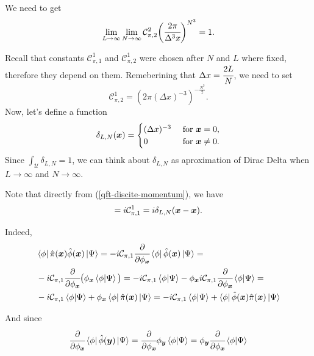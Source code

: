 \documentclass[main.tex]{subfiles}
\begin{document}
We need to get
\begin{equation}
\lim_{L\to \infty}\lim_{N\to \infty} \mathcal{C}^2_{\pi,2}\bigg(\cfrac{2\pi}{\Delta^3 x} \bigg)^{N^3}  = 1.
\end{equation}

Recall that constants $\mathcal{C}^1_{\pi,1}$ and $\mathcal{C}^1_{\pi,2}$ were chosen after $N$ and $L$ where fixed, therefore they depend on them. 
Remeberining that $\Delta x = \cfrac{2L}{N}$, we need to set
\begin{equation}
\mathcal{C}^1_{\pi,2} = (2\pi (\Delta x)^{-3})^{- \frac{N^3}{2}}.
\end{equation}
Now, let's define a function
\begin{equation}
\delta_{L,N}(\boldsymbol{x}) = 
\begin{cases}
(\Delta x)^{-3} &\text{ for } \boldsymbol{x} = 0,\\
0 &\text{ for } \boldsymbol{x} \not=0.
\end{cases}
\end{equation}
Since $\int_\mathcal{U} \delta_{L,N} = 1$, we can think about $\delta_{L,N}$ as aproximation of Dirac Delta when $L\to\infty$ and $N\to\infty$.

Note that directly from (\ref{qft-discite-momentum}), we have
\begin{equation}
[\hat{\phi}(\bs{x}), \hat{\pi}(\bs{x})] = i \mathcal{C}^1_{\pi,1} = i \delta_{L,N}(\bs{x} - \bs{x}).
\end{equation}

Indeed,
\begin{align*}
& \bra{\phi} \hat{\pi}(\boldsymbol{x}) \hat{\phi}(\boldsymbol{x})\ket{\Psi} = -i\mathcal{C}_{\pi, 1}
\cfrac{\partial}{\partial \phi_{\boldsymbol{x}}}
\bra{\phi} \hat{\phi}(\boldsymbol{x})\ket{\Psi} = \\
& -i\mathcal{C}_{\pi, 1} \cfrac{\partial}{\partial \phi_{\boldsymbol{x}}}
\big( \phi_{\boldsymbol{x}} \bra{\phi}\ket{\Psi}\big) = -i \mathcal{C}_{\pi, 1} \bra{\phi}\ket{\Psi} - \phi_{\boldsymbol{x}}i\mathcal{C}_{\pi, 1}
\cfrac{\partial}{\partial \phi_{\boldsymbol{x}}}\bra{\phi}\ket{\Psi} = \\
& -i \mathcal{C}_{\pi, 1} \bra{\phi}\ket{\Psi} + \phi_{\boldsymbol{x}} \bra{\phi} \hat{\pi}(\boldsymbol{x}) \ket{\Psi} =
-i \mathcal{C}_{\pi, 1} \bra{\phi}\ket{\Psi} + \bra{\phi}\hat{\phi}(\boldsymbol{x})\hat{\pi}(\boldsymbol{x}) \ket{\Psi}
\end{align*}

And since 
\begin{align*}
\cfrac{\partial}{\partial \phi_{\boldsymbol{x}}}  \bra{\phi} \hat{\phi}(\boldsymbol{y}) \ket{\Psi} = 
\cfrac{\partial}{\partial \phi_{\boldsymbol{x}}} \phi_{\boldsymbol{y}}  \bra{\phi} \ket{\Psi} =
\phi_{\boldsymbol{y}} \cfrac{\partial}{\partial \phi_{\boldsymbol{x}}} \bra{\phi} \ket{\Psi}
\end{align*}
\end{document}
